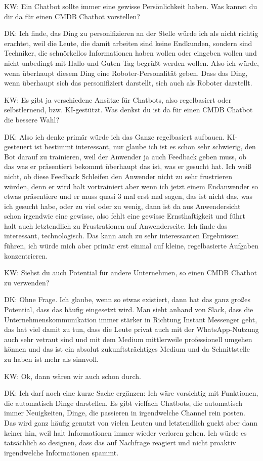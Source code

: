\begin{list}{X:}{\setlength{\labelsep}{5mm}}
\item[KW:] Ein Chatbot sollte immer eine gewisse Persönlichkeit haben. Was kannst du dir da für einen CMDB Chatbot vorstellen?
\item[DK:] Ich finde, das Ding zu personifizieren an der Stelle würde ich als nicht richtig erachtet, weil die Leute, die damit arbeiten sind keine Endkunden, sondern sind Techniker, die schnörkellos Informationen haben wollen oder eingeben wollen und nicht unbedingt mit Hallo und Guten Tag begrüßt werden wollen. Also ich würde, wenn überhaupt diesem Ding eine Roboter-Personalität geben. Dass das Ding, wenn überhaupt sich das personifiziert darstellt, sich auch als Roboter darstellt.  
\item[KW:] Es gibt ja verschiedene Ansätze für Chatbots, also regelbasiert oder selbstlernend, bzw. KI-gestützt. Was denkst du ist da für einen CMDB Chatbot die bessere Wahl?
\item[DK:] Also ich denke primär würde ich das Ganze regelbasiert aufbauen. KI-gesteuert ist bestimmt interessant, nur glaube ich ist es schon sehr schwierig, den Bot darauf zu trainieren, weil der Anwender ja auch Feedback geben muss, ob das was er präsentiert bekommt überhaupt das ist, was er gesucht hat. Ich weiß nicht, ob diese Feedback Schleifen den Anwender nicht zu sehr frustrieren würden, denn er wird halt vortrainiert aber wenn ich jetzt einem Endanwender so etwas präsentiere und er muss quasi 3 mal erst mal sagen, das ist nicht das, was ich gesucht habe, oder zu viel oder zu wenig, dann ist da aus Anwendersicht schon irgendwie eine gewisse, also fehlt eine gewisse Ernsthaftigkeit und führt halt auch letztendlich zu Frustrationen auf Anwenderseite. Ich finde das interessant, technologisch. Das kann auch zu sehr interessanten Ergebnissen führen, ich würde mich aber primär erst einmal auf kleine, regelbasierte Aufgaben konzentrieren.  
\item[KW:] Siehst du auch Potential für andere Unternehmen, so einen CMDB Chatbot zu verwenden?
\item[DK:] Ohne Frage. Ich glaube, wenn so etwas existiert, dann hat das ganz großes Potential, dass das häufig eingesetzt wird. Man sieht anhand von Slack, dass die Unternehmenskommunikation immer stärker in Richtung Instant Messenger geht, das hat viel damit zu tun, dass die Leute privat auch mit der WhatsApp-Nutzung auch sehr vetraut sind und mit dem Medium mittlerweile professionell umgehen können und das ist ein absolut zukunftsträchtiges Medium und da Schnittstelle zu haben ist mehr als sinnvoll.
\item[KW:] Ok, dann wären wir auch schon durch.
\item[DK:] Ich darf noch eine kurze Sache ergänzen: Ich wäre vorsichtig mit Funktionen, die automatisch Dinge darstellen. Es gibt vielfach Chatbots, die automatisch immer Neuigkeiten, Dinge, die passieren in irgendwelche Channel rein posten. Das wird ganz häufig genutzt von vielen Leuten und letztendlich guckt aber dann keiner hin, weil halt Informationen immer wieder verloren gehen. Ich würde es tatsächlich so designen, dass das auf Nachfrage reagiert und nicht proaktiv irgendwelche Informationen spammt.
\end{list}

